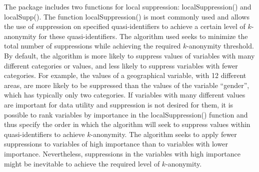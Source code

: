 \documentclass[letterpaper,10pt,english]{sphinxmanual}
\begin{document}
The  package includes two functions for local suppression:
localSuppression() and localSupp(). The function localSuppression() is
most commonly used and allows the use of suppression on specified
quasi-identifiers to achieve a certain level of \(k\)-anonymity for
these quasi-identifiers. The algorithm used seeks to minimize the total
number of suppressions while achieving the required \(k\)-anonymity
threshold. By default, the algorithm is more likely to suppress values
of variables with many different categories or values, and less likely
to suppress variables with fewer categories. For example, the values of
a geographical variable, with 12 different areas, are more likely to be
suppressed than the values of the variable “gender”, which has typically
only two categories. If variables with many different values are
important for data utility and suppression is not desired for them, it
is possible to rank variables by importance in the localSuppression()
function and thus specify the order in which the algorithm will seek to
suppress values within quasi-identifiers to achieve \(k\)-anonymity.
The algorithm seeks to apply fewer suppressions to variables of high
importance than to variables with lower importance. Nevertheless,
suppressions in the variables with high importance might be inevitable
to achieve the required level of \(k\)-anonymity.
\end{document}
